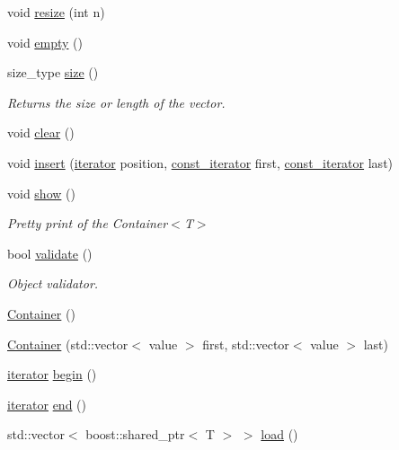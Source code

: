 \begin{DoxyCompactItemize}
\item 
void \hyperlink{class_container_ab77ce6f8173bd47c4cf46643317dffdb}{resize} (int n)
\item 
void \hyperlink{class_container_ab8e09c25f519687468ef5b9f0fae9b3e}{empty} ()
\item 
size\_\-type \hyperlink{class_container_a842c3d9eca81b78b59112fde9707b091}{size} ()
\begin{DoxyCompactList}\small\item\em Returns the size or length of the vector. \end{DoxyCompactList}\item 
void \hyperlink{class_container_aab0690d44c8e04614cea46935ff49e7a}{clear} ()
\item 
void \hyperlink{class_container_a9c0320e9873286ea5a3b70c2ce29bdf4}{insert} (\hyperlink{class_container_afe880028d8304353129f47cd1d28c20a}{iterator} position, \hyperlink{class_container_a5eabadaffdd508cb623c955eb0af1518}{const\_\-iterator} first, \hyperlink{class_container_a5eabadaffdd508cb623c955eb0af1518}{const\_\-iterator} last)
\item 
void \hyperlink{class_container_ad72379ee222b073a5eecec7fc1bedfc2}{show} ()
\begin{DoxyCompactList}\small\item\em Pretty print of the Container$<$T$>$ \end{DoxyCompactList}\item 
bool \hyperlink{class_container_aa99a036fd0fe6d6b82ba558157e557d3}{validate} ()
\begin{DoxyCompactList}\small\item\em Object validator. \end{DoxyCompactList}\item 
\hyperlink{class_container_ab17ce1f67243b28abcd4c8113a72524c}{Container} ()
\item 
\hyperlink{class_container_a1ed1d5384e85f713e40bfb539e23c9ce}{Container} (std::vector$<$ value $>$ first, std::vector$<$ value $>$ last)
\item 
\hyperlink{class_container_afe880028d8304353129f47cd1d28c20a}{iterator} \hyperlink{class_container_a9ad6802d12bf5f48400bc346de37ad0f}{begin} ()
\item 
\hyperlink{class_container_afe880028d8304353129f47cd1d28c20a}{iterator} \hyperlink{class_container_a769250b7546b782007f1adaba8a07336}{end} ()
\item 
std::vector$<$ boost::shared\_\-ptr$<$ T $>$ $>$ \hyperlink{class_container_a9161a87726434f8955398137c647947c}{load} ()

\end{DoxyCompactItemize}

